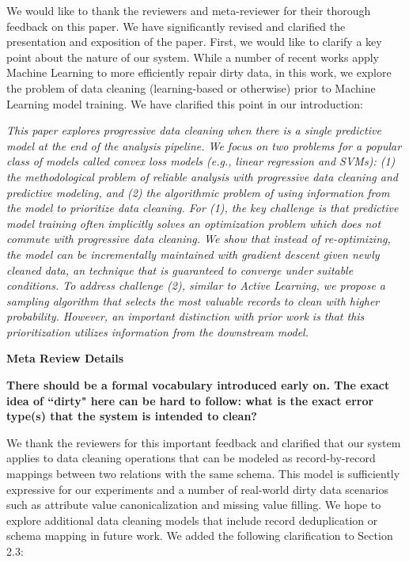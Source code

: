 We would like to thank the reviewers and meta-reviewer for
their thorough feedback on this paper.
We have significantly revised and clarified the presentation and exposition
of the paper.
First, we would like to clarify a key point about the nature of our system.
While a number of recent works apply Machine Learning to more efficiently repair dirty data, in this work, we explore the problem of data cleaning (learning-based or otherwise) prior to Machine Learning model training.
We have clarified this point in our introduction:

\vspace{0.25em}

\emph{This paper explores progressive data cleaning when there is a single predictive model at the end of the analysis pipeline.
We focus on two problems for a popular class of models called convex loss models (e.g., linear regression and SVMs): (1) the methodological problem of reliable analysis with progressive data cleaning and predictive modeling, and (2) the algorithmic problem of using information from the model to prioritize data cleaning.
For (1), the key challenge is that predictive model training often implicitly solves an optimization problem which does not commute with progressive data cleaning.
We show that instead of re-optimizing, the model can be incrementally maintained with gradient descent given newly cleaned data, an technique that is guaranteed to converge under suitable conditions.
To address challenge (2), similar to Active Learning, we propose a sampling algorithm that selects the most valuable records to clean with higher probability.
However, an important distinction with prior work is that this prioritization utilizes information from the downstream model.}

\vspace{0.25em}

\noindent\textbf{Meta Review Details} 

\vspace{0.25em}

\noindent \textbf{There should be a formal vocabulary introduced early on. The exact idea of ``dirty" here can be hard to follow: what is the exact error type(s) that the system is intended to clean?}

\vspace{0.25em}

We thank the reviewers for this important feedback and clarified that our system applies to data cleaning operations that can be modeled as record-by-record mappings between two relations with the same schema.
This model is sufficiently expressive for our experiments and a number of real-world dirty data scenarios such as attribute value canonicalization and missing value filling.
We hope to explore additional data cleaning models that include record deduplication or schema mapping in future work.
We added the following clarification to Section 2.3:

